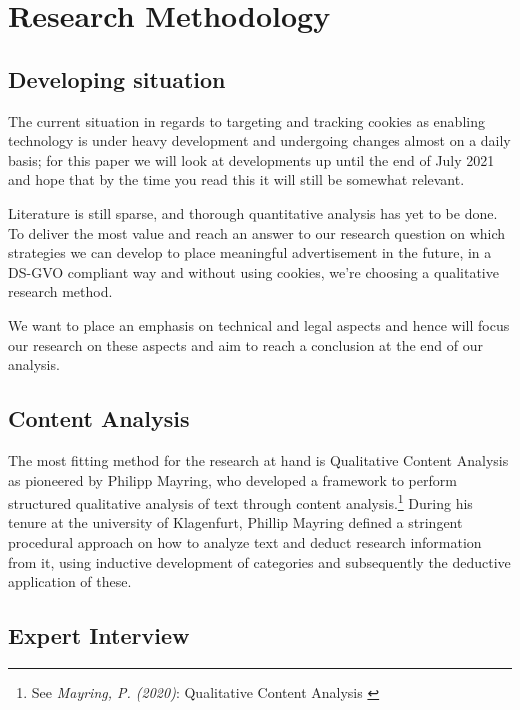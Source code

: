%
%

\pagebreak
\section{Research Methodology}

\onehalfspacing

\subsection{Developing situation}

The current situation in regards to targeting and tracking cookies as enabling technology is under heavy development and undergoing changes almost on a daily basis; for this paper we will look at developments up until the end of July 2021 and hope that by the time you read this it will still be somewhat relevant.

Literature is still sparse, and thorough quantitative analysis has yet to be done. To deliver the most value and reach an answer to our research question on which strategies we can develop to place meaningful advertisement in the future, in a DS-GVO compliant way and without using cookies, we're choosing a qualitative research method.

We want to place an emphasis on technical and legal aspects and hence will focus our research on these aspects and aim to reach a conclusion at the end of our analysis.

\subsection{Content Analysis}

The most fitting method for the research at hand is Qualitative Content Analysis as pioneered by Philipp Mayring, who developed a framework to perform structured qualitative analysis of text through content analysis.\footnote{See \textit{Mayring, P. (2020)}: Qualitative Content Analysis \cite{qualiContent}} During his tenure at the university of Klagenfurt, Phillip Mayring defined a stringent procedural approach on how to analyze text and deduct research information from it, using inductive development of categories and subsequently the deductive application of these.

\subsection{Expert Interview}

